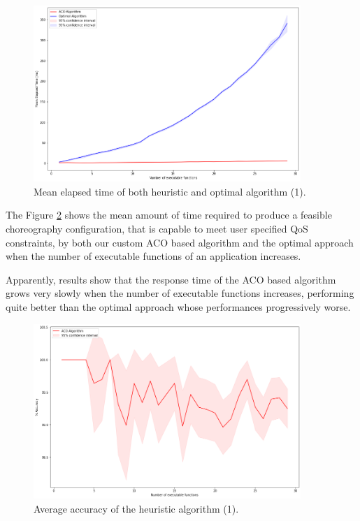 \documentclass[12pt,a4paper]{report}
\begin{document}
\begin{figure}[h]
	\centering
	\includegraphics[width=0.9\textwidth]{./Images/ACOvsOptimalIncreasingExecutable.png}
	\caption{Mean elapsed time of both heuristic and optimal algorithm (1).}%
	\label{ACOvsOptimalIncreasingExecutable}
\end{figure}

The Figure \ref{ACOvsOptimalIncreasingExecutable} shows the mean amount of time required to produce a feasible choreography configuration, that is capable to meet user specified QoS constraints, by both our custom ACO based algorithm and the optimal approach when the number of executable functions of an application increases. 

Apparently, results show that the response time of the ACO based algorithm grows very slowly when the number of executable functions increases, performing quite better than the optimal approach whose performances progressively worse.

\begin{figure}[h]
	\centering
	\includegraphics[width=0.9\textwidth]{./Images/ACOvsOptimalAccuracyIncreasingExecutable.png}
	\caption{Average accuracy of the heuristic algorithm (1).}%
	\label{ACOvsOptimalIncreasingExecutable}
\end{figure}
\end{document}
